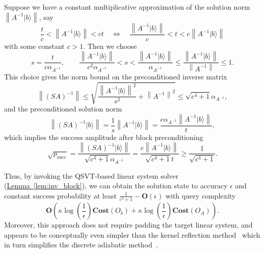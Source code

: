 \documentclass[letterpaper,onecolumn,11pt,accepted=2026-02-14]{quantumarticle}
\newcommand{\norm}[1]{\left\lVert#1\right\rVert}
\theoremstyle{remark}
\theoremstyle{plain}
\newcommand{\lem}[1]{\hyperref[lem:#1]{Lemma~\ref*{lem:#1}}}
\newcommand{\ket}[1]{|#1\rangle}
\begin{document}
Suppose we have a constant multiplicative approximation of the solution norm $\norm{A^{-1}\ket{b}}$, say
\begin{equation}
\label{eq:qls_precond_multi}
    \frac{t}{c}<\norm{A^{-1}\ket{b}}<ct
    \quad\Leftrightarrow\quad
    \frac{\norm{A^{-1}\ket{b}}}{c}< t<c\norm{A^{-1}\ket{b}}
\end{equation}
with some constant $c>1$. Then we choose
\begin{equation}
\label{eq:qls_precond_parameter}
    s=\frac{t}{c\alpha_{A^{-1}}},\qquad
    \frac{\norm{A^{-1}\ket{b}}}{c^2\alpha_{A^{-1}}}<s<\frac{\norm{A^{-1}\ket{b}}}{\alpha_{A^{-1}}}\leq\frac{\norm{A^{-1}\ket{b}}}{\norm{A^{-1}}}\leq 1.
\end{equation}
This choice gives the norm bound on the preconditioned inverse matrix
\begin{equation}
    \norm{(SA)^{-1}}\leq\sqrt{\frac{\norm{A^{-1}\ket{b}}^2}{s^2}+\norm{A^{-1}}^2}
    \leq\sqrt{c^4+1}\alpha_{A^{-1}},
\end{equation}
and the preconditioned solution norm
\begin{equation}
    \norm{(SA)^{-1}\ket{b}}
    =\frac{1}{s}\norm{A^{-1}\ket{b}}
    =\frac{c\alpha_{A^{-1}}\norm{A^{-1}\ket{b}}}{t},
\end{equation}
which implies the success amplitude after block preconditioning
\begin{equation}
    \sqrt{p_{\text{succ}}}
    =\frac{\norm{(SA)^{-1}\ket{b}}}{\sqrt{c^4+1}\alpha_{A^{-1}}}
    =\frac{c\norm{A^{-1}\ket{b}}}{\sqrt{c^4+1}t}\geq\frac{1}{\sqrt{c^4+1}}.
\end{equation}

Thus, by invoking the QSVT-based linear system solver (\lem{inv_block}), we can obtain the solution state to accuracy $\epsilon$ and constant success probability at least $\frac{1}{c^4+1}-\mathbf{O}(\epsilon)$ with query complexity
\begin{equation}
    \mathbf{O}\left(\kappa\log\left(\frac{1}{\epsilon}\right)\mathbf{Cost}(O_b)
    +\kappa\log\left(\frac{1}{\epsilon}\right)\mathbf{Cost}(O_A)\right).
\end{equation}
Moreover, this approach does not require padding the target linear system, and appears to be conceptually even simpler than the kernel reflection method~\cite{Dalzell2024shortcut} which in turn simplifies the discrete adiabatic method~\cite{Costa2021linearsystems}.
\end{document}
